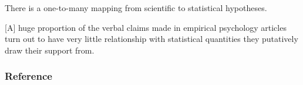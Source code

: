 \documentclass{beamer}
\begin{document}
\begin{frame}
    \hspace*{\fill}
    \raisebox{74.5pt}{
        \begin{minipage}[t]{1em}
            \fontsize{56}{66}\selectfont
            \bfseries
            ,,
        \end{minipage}
    }
    \begin{minipage}{24em}
        There is a one-to-many mapping from scientific to statistical
        hypotheses.

        \begin{flushright}
            \bigskip
            \scriptsize
            \citep[str. 6]{gelmanGardenForkingPaths2013}
        \end{flushright}

        \bigskip

        [A] huge proportion of the verbal claims made in empirical psychology
        articles turn out to have very little relationship with statistical
        quantities they putatively draw their support from.

        \begin{flushright}
            \bigskip
            \scriptsize
            \raggedleft
            \citep[str. 2]{yarkoniGeneralizabilityCrisis2019}
        \end{flushright}
    \end{minipage}
    \hspace*{\fill}
\end{frame}


\begin{frame}[allowframebreaks]
    \frametitle{Reference}

    
    
\end{frame}
\end{document}
